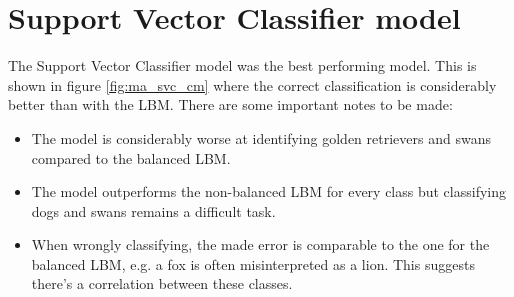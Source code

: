 
\section{Support Vector Classifier model}
\label{section:ma_svc_balanced}

The Support Vector Classifier model was the best performing model.
This is shown in figure \ref{fig:ma_svc_cm} where the correct classification is considerably better than with the LBM. There are some important notes to be made:
\begin{itemize}
    \item The model is considerably worse at identifying golden retrievers and swans compared to the balanced LBM.
    \item The model outperforms the non-balanced LBM for every class but classifying dogs and swans remains a difficult task.
    \item When wrongly classifying, the made error is comparable to the one for the balanced LBM, e.g. a fox is often misinterpreted as a lion. This suggests there's a correlation between these classes.
\end{itemize}

